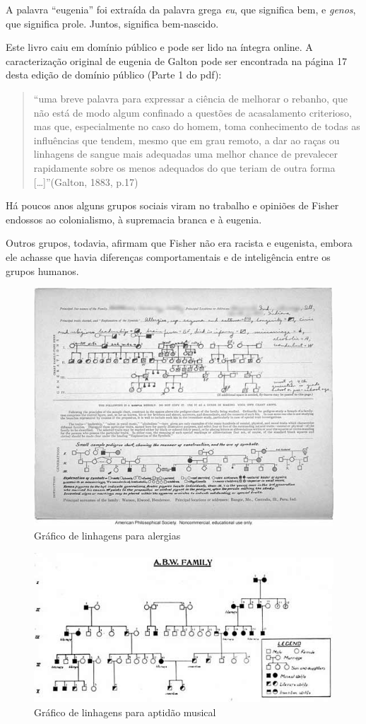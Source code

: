 \documentclass[
]{book}
\theoremstyle{definition}
\theoremstyle{definition}
\theoremstyle{definition}
\theoremstyle{definition}
\theoremstyle{remark}
\begin{document}
A palavra ``eugenia'' foi extraída da palavra grega \emph{eu}, que significa bem, e \emph{genos}, que significa prole. Juntos, significa bem-nascido.

Este livro caiu em domínio público e pode ser lido na íntegra online. A caracterização original de eugenia de Galton pode ser encontrada na página 17 desta edição de domínio público (Parte 1 do pdf):

\begin{quote}
``uma breve palavra para expressar a ciência de melhorar o rebanho, que não está de modo algum confinado a questões de acasalamento criterioso, mas que, especialmente no caso do homem, toma conhecimento de todas as influências que tendem, mesmo que em grau remoto, a dar ao raças ou linhagens de sangue mais adequadas uma melhor chance de prevalecer rapidamente sobre os menos adequados do que teriam de outra forma {[}\ldots{]}''(Galton, 1883, p.17)
\end{quote}

Há poucos anos alguns grupos sociais viram no trabalho e opiniões de Fisher endossos ao colonialismo, à supremacia branca e à eugenia.

Outros grupos, todavia, afirmam que Fisher não era racista e eugenista, embora ele achasse que havia diferenças comportamentais e de inteligência entre os grupos humanos.

\begin{figure}

{\centering \includegraphics[width=0.5\linewidth]{images/chart_pedigree_allergy2} 

}

\caption{Gráfico de linhagens para alergias}\label{fig:unnamed-chunk-15}
\end{figure}

\begin{figure}

{\centering \includegraphics[width=0.5\linewidth]{images/chart_pedigree_music2 (1)} 

}

\caption{Gráfico de linhagens para aptidão musical}\label{fig:unnamed-chunk-16}
\end{figure}
\end{document}
